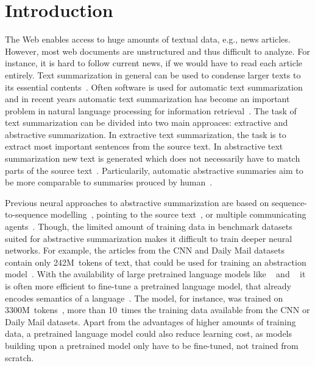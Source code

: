 \section{Introduction} %

The Web enables access to huge amounts of textual data, e.g., news articles.
However, most web documents are unstructured and thus difficult to analyze.
For instance, it is hard to follow current news, if we would have to read each article entirely.
Text summarization in general can be used to condense larger texts to its essential contents~\cite[xix]{Torres-Moreno2014}.
Often software is used for automatic text summarization and in recent years
automatic text summarization has become an important problem in natural language processing for information retrieval~\cite[xxi]{Torres-Moreno2014}.
The task of text summarization can be divided into two main approaces: extractive and abstractive summarization. In extractive text summarization, the task is to extract most important sentences from the source text. In abstractive text summarization new text is generated which does not necessarily have to match parts of the source text~\cite[28]{Torres-Moreno2014}.
Particularily, automatic abstractive summaries aim to be more comparable to summaries prouced by human~\cite[220]{Torres-Moreno2014}.

Previous neural approaches to abstractive summarization are based on sequence-to-sequence modelling~\cite{NallapatiZSGX2016}, pointing to the source text~\cite{SeeLM2017}, or multiple communicating agents~\cite{CelikyilmazBHC2018}.
Though, the limited amount of training data in benchmark datasets suited for abstractive summarization makes it difficult to train deeper neural networks.
For example, the articles from the CNN and Daily Mail datasets contain only 242M~tokens of text, that could be used for training an abstraction model~\cite{HermannKGEKSB2015}.
With the availability of large pretrained language models like \Elmo~\cite{PetersNIGCLZ2018} and \Bert~\cite{DevlinCLT2019} it is often more efficient to fine-tune a pretrained language model, that already encodes semantics of a language~\cite{LiuL2019}.
The \Bert model, for instance, was trained on 3300M~tokens~\cite{DevlinCLT2019}, more than 10~times the training data available from the CNN or Daily Mail datasets.
Apart from the advantages of higher amounts of training data, a pretrained language model could also reduce learning cost, as models building upon a pretrained model only have to be fine-tuned, not trained from scratch.


